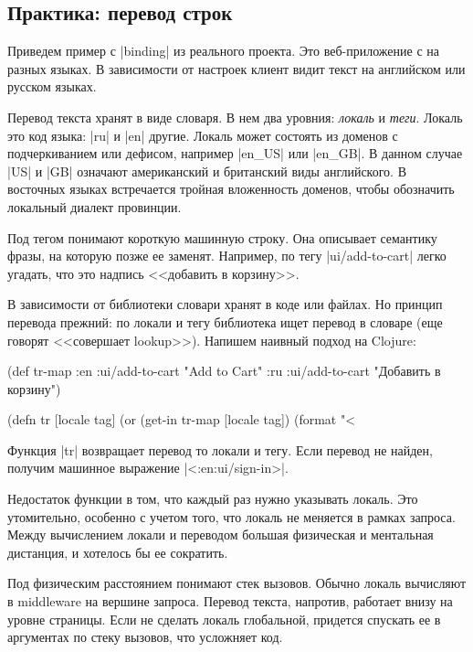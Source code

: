 \subsection{Практика: перевод строк}

Приведем пример с \spverb|binding| из реального проекта. Это веб-приложение с на
разных языках. В зависимости от настроек клиент видит текст на английском или
русском языках.

Перевод текста хранят в виде словаря. В нем два уровния: \emph{локаль} и
\emph{теги}. Локаль это код языка: \spverb|ru| и \spverb|en| другие. Локаль
может состоять из доменов с подчеркиванием или дефисом, например \spverb|en_US|
или \spverb|en_GB|. В данном случае \spverb|US| и \spverb|GB| означают
американский и британский виды английского. В восточных языках встречается
тройная вложенность доменов, чтобы обозначить локальный диалект провинции.

Под тегом понимают короткую машинную строку. Она описывает семантику фразы, на
которую позже ее заменят. Например, по тегу \spverb|ui/add-to-cart| легко
угадать, что это надпись <<добавить в корзину>>.

В зависимости от библиотеки словари хранят в коде или файлах. Но принцип
перевода прежний: по локали и тегу библиотека ищет перевод в словаре (еще
говорят <<совершает lookup>>). Напишем наивный подход на Clojure:

  \begin{clojure}
(def tr-map
  {:en {:ui/add-to-cart "Add to Cart"}
   :ru {:ui/add-to-cart "Добавить в корзину"}})

(defn tr [locale tag]
  (or (get-in tr-map [locale tag])
      (format "<%
  \end{clojure}

Функция \spverb|tr| возвращает перевод то локали и тегу. Если перевод не найден,
получим машинное выражение \spverb|<:en:ui/sign-in>|.

Недостаток функции в том, что каждый раз нужно указывать локаль. Это
утомительно, особенно с учетом того, что локаль не меняется в рамках
запроса. Между вычислением локали и переводом большая физическая и ментальная
дистанция, и хотелось бы ее сократить.

Под физическим расстоянием понимают стек вызовов. Обычно локаль вычисляют в
middleware на вершине запроса. Перевод текста, напротив, работает внизу на
уровне страницы. Если не сделать локаль глобальной, придется спускать ее в
аргументах по стеку вызовов, что усложняет код.

